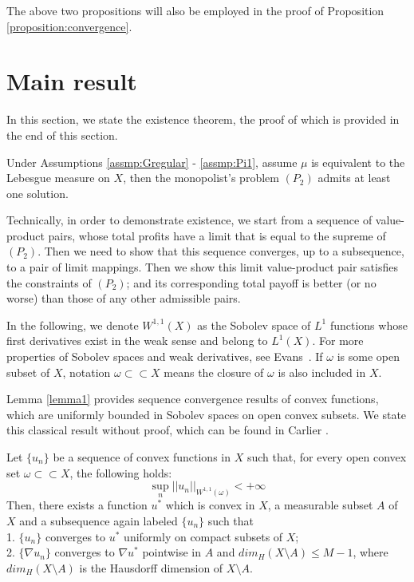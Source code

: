 The above two propositions will also be employed in the proof of Proposition \ref{proposition:convergence}. 

\bigskip







\section{Main result}\label{section:mainresult}
In this section, we state the existence theorem, the proof of which is provided in the end of this section.


\begin{theorem}[Existence]
	Under Assumptions \ref{assmp:Gregular} - \ref{assmp:Pi1}, assume $\mu$ is equivalent to the Lebesgue measure on $X$, then the monopolist's problem $(P_2)$ admits at least one solution.
\end{theorem}

Technically, in order to demonstrate existence, we start from a sequence of value-product pairs, whose total profits have a limit that is equal to the supreme of $(P_2)$.
Then we need to show that this sequence converges, up to a subsequence, to a pair of limit mappings. Then we show this limit value-product pair satisfies the constraints of $(P_2)$; and its corresponding total payoff is better (or no worse) than those of any other admissible pairs. \medskip


In the following, we denote $W^{1,1}(X)$ as the Sobolev space of $L^1$ functions whose first derivatives exist in the weak sense and belong to $L^1(X)$. For more properties of Sobolev spaces and weak derivatives, see Evans~\cite[Chapter 5]{Evans98}. If $\omega$ is some open subset of $X$, notation $\omega \subset \subset X$ means the closure of $\omega$ is also included in $X$.\medskip

Lemma \ref{lemma1} provides sequence convergence results of convex functions, which are uniformly bounded in Sobolev spaces on open convex subsets. We state this classical result without proof, which can be found in Carlier \cite{Carlier01}.\medskip


\begin{lemma}\label{lemma1}
	Let $\{u_n\}$ be a sequence of convex functions in $X$ such that, for every open convex set $\omega \subset \subset X$, the following holds:
	\begin{equation*}
	\sup\limits_{n} ||u_n||_{W^{1,1}(\omega)} < +\infty
	\end{equation*}
	Then, there exists a function $u^*$ %
	which is convex in $X$, a measurable subset $A$ of $X$ and a subsequence again labeled $\{u_n\}$ such that\\
	1. $\{u_n\}$ converges to $u^*$ uniformly on compact subsets of $X$;\\
	2. $\{\nabla u_n\}$ converges to $\nabla u^*$ pointwise in $A$ and $dim_{H}(X\setminus A)\le M-1$, where $dim_{H}(X\setminus A)$ is the Hausdorff dimension of $X\setminus A$.
\end{lemma}

